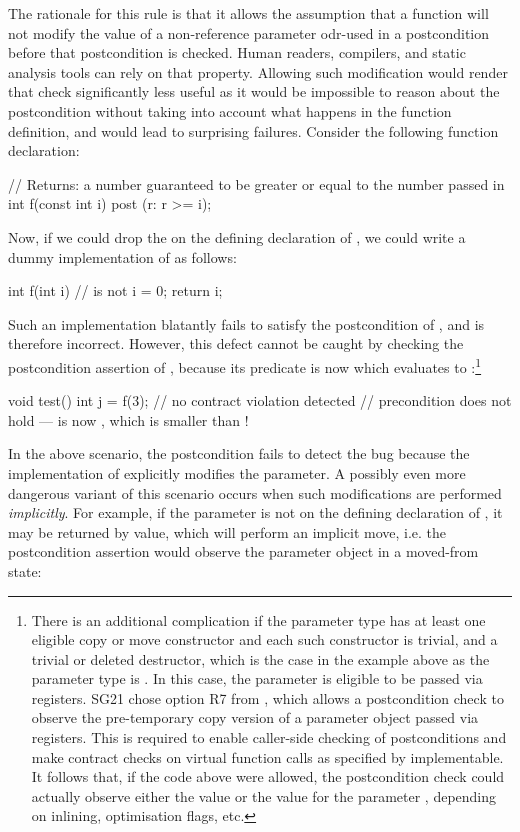 The rationale for this rule is that it allows the assumption that a function will not modify the value of a non-reference parameter odr-used in a postcondition before that postcondition is checked. Human readers, compilers, and static analysis tools can rely on that property. Allowing such modification would render that check significantly less useful as it would be impossible to reason about the postcondition without taking into account what happens in the function definition, and would lead to surprising failures. Consider the following function declaration:
\begin{codeblock}
// Returns: a number guaranteed to be greater or equal to the number passed in
int f(const int i) post (r: r >= i);
\end{codeblock}
Now, if we could drop the  on the defining declaration of , we could write a dummy implementation of  as follows:
\begin{codeblock}
int f(int i) {  //  is not 
  i = 0;
  return i;
}
\end{codeblock}
Such an implementation blatantly fails to satisfy the postcondition of , and is therefore incorrect. However, this defect cannot be caught by checking the postcondition assertion of , because its predicate is now  which evaluates to :\footnote{There is an additional complication if the parameter type has at least one
eligible copy or move constructor and each such constructor is trivial, and a trivial or deleted destructor, which is the case in the example above as the parameter type is . In this case, the parameter is eligible to be passed via registers. SG21 chose option R7 from \cite{P3487R0}, which allows a postcondition check to observe the pre-temporary copy version of a parameter object passed via registers. This is required to enable caller-side checking of postconditions and make contract checks on virtual function calls as specified by \cite{P2900R10} implementable. It follows that, if the code above were allowed, the postcondition check could actually observe either the value  or the value  for the parameter , depending on inlining, optimisation flags, etc.}
\begin{codeblock}
void test() {
  int j = f(3); // no contract violation detected
  // precondition does not hold ---  is now , which is smaller than !
}
\end{codeblock}
In the above scenario, the postcondition fails to detect the bug because the implementation of  explicitly modifies the parameter. A possibly even more dangerous variant of this scenario occurs when such modifications are performed \emph{implicitly}. For example, if the parameter is not  on the defining declaration of , it may be returned by value, which will perform an implicit move, i.e. the postcondition assertion would observe the parameter object in a moved-from state:
